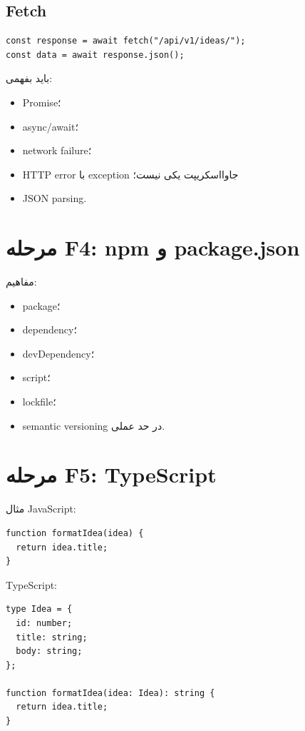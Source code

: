 \subsection{Fetch}

\begin{latin}
\begin{lstlisting}
const response = await fetch("/api/v1/ideas/");
const data = await response.json();
\end{lstlisting}
\end{latin}

باید بفهمی:
\begin{itemize}
  \item Promise؛
  \item async/await؛
  \item network failure؛
  \item HTTP error با exception جاوااسکریپت یکی نیست؛
  \item JSON parsing.
\end{itemize}

\section{مرحله F4: npm و package.json}

مفاهیم:
\begin{itemize}
  \item package؛
  \item dependency؛
  \item devDependency؛
  \item script؛
  \item lockfile؛
  \item semantic versioning در حد عملی.
\end{itemize}

\section{مرحله F5: TypeScript}

مثال JavaScript:
\begin{latin}
\begin{lstlisting}
function formatIdea(idea) {
  return idea.title;
}
\end{lstlisting}
\end{latin}

TypeScript:
\begin{latin}
\begin{lstlisting}
type Idea = {
  id: number;
  title: string;
  body: string;
};

function formatIdea(idea: Idea): string {
  return idea.title;
}
\end{lstlisting}
\end{latin}

